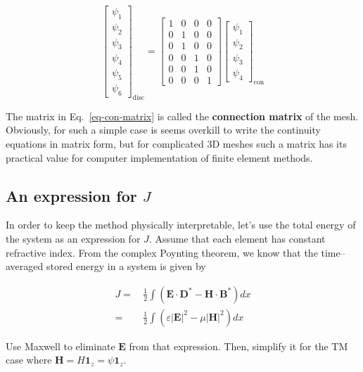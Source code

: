 \begin{equation}
\begin{bmatrix}
\psi_1 \\ \psi_2 \\ \psi_3 \\ \psi_4 \\ \psi_5 \\ \psi_6
\end{bmatrix}_{\mathrm{disc}}
=
\begin{bmatrix}
1 & 0 & 0 & 0  \\ 
0 & 1 & 0 & 0  \\   
0 & 1 & 0 & 0  \\ 
0 & 0 & 1 & 0  \\   
0 & 0 & 1 & 0  \\  
0 & 0 & 0 & 1  
\end{bmatrix}
\begin{bmatrix}
\psi_1 \\ \psi_2 \\ \psi_3 \\ \psi_4
\end{bmatrix}_{\mathrm{con}}
\label{eq-con-matrix}
\end{equation} 

The matrix in Eq.~\ref{eq-con-matrix} is called the \textbf{connection matrix} of the mesh. Obviously, for such a simple case is seems overkill to write the continuity equations in matrix form, but for complicated 3D meshes such a matrix has its practical value for computer implementation of finite element methods.

\subsection{An expression for $J$}

In order to keep the method physically interpretable, let's use the total energy of the system as an expression for $J$. Assume that each element has constant refractive index. From the complex Poynting theorem, we know that the time--averaged stored energy in a system is given by

\begin{align}
J =& \, \frac{1}{2} \int ( {\mathbf E} \cdot {\mathbf D}^* - {\mathbf H} \cdot {\mathbf B}^* ) dx \\
  =& \, \frac{1}{2} \int ( \varepsilon |{\mathbf E}|^2 - \mu |{\mathbf H}|^2 ) dx
\end{align} 

\begin{cue}
Use Maxwell to eliminate ${\mathbf E}$ from that expression. Then, simplify it for the TM case where ${\mathbf H} = H {\mathbf 1}_z = \psi {\mathbf 1}_z $.  
\end{cue}

